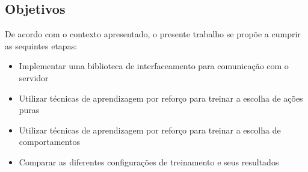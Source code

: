 \subsection{Objetivos}
\par De acordo com o contexto apresentado, o presente trabalho se propõe a cumprir as sequintes etapas:
\begin{itemize}
	\item Implementar uma biblioteca de interfaceamento para comunicação com o servidor
	\item Utilizar técnicas de aprendizagem por reforço para treinar a escolha de ações puras
	\item Utilizar técnicas de aprendizagem por reforço para treinar a escolha de comportamentos
	\item Comparar as diferentes configurações de treinamento e seus resultados
\end{itemize}

